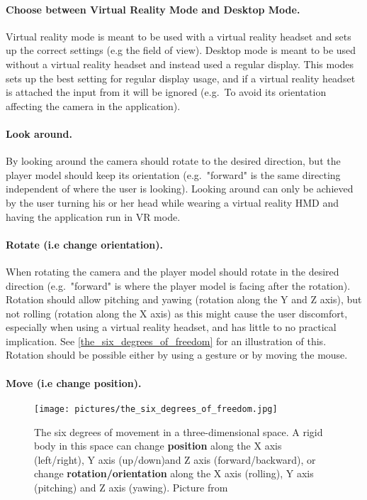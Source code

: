 \paragraph{Choose between Virtual Reality Mode and Desktop Mode.} Virtual reality mode is meant to be used with a virtual reality headset
and sets up the correct settings (e.g the field of view). Desktop mode is meant to be used without a virtual reality headset and instead used
a regular display. This modes sets up the best setting for regular display usage, and if a virtual reality headset is attached the input from it will be ignored 
(e.g.~To avoid its orientation affecting the camera in the application).

\paragraph{Look around.} By looking around the camera should rotate to the desired direction, but the player model should keep its orientation 
(e.g.~"forward" is the same directing independent of where the user is looking). Looking around can only be achieved by the user turning his or her 
head while wearing a virtual reality HMD and having the application run in VR mode.

\paragraph{Rotate (i.e change orientation).} When rotating the camera and the player model should rotate in the desired direction (e.g.~"forward" is where the player model is
facing after the rotation).
Rotation should allow pitching and yawing (rotation along the Y and Z axis), but not rolling (rotation along the X axis) as this might cause the user discomfort, especially when
using a virtual reality headset, and has little to no practical implication. See \ref{the_six_degrees_of_freedom} for an illustration of this. 
Rotation should be possible either by using a gesture or by moving the mouse.

\paragraph{Move (i.e change position).} 


\begin{figure}%
	\texttt{[image: pictures/the\_six\_degrees\_of\_freedom.jpg]}
	\caption[The six degrees of freedom]{The six degrees of movement in a three-dimensional space. A rigid body in this space can change \textbf{position} along the X axis (left/right), 
	Y axis (up/down)and Z axis (forward/backward), or change \textbf{rotation/orientation} along the X axis (rolling), Y axis (pitching) and Z axis (yawing).
	Picture from \citet{6DOF}}
	\label{fig:the_six_degrees_of_freedom}
\end{figure} 



